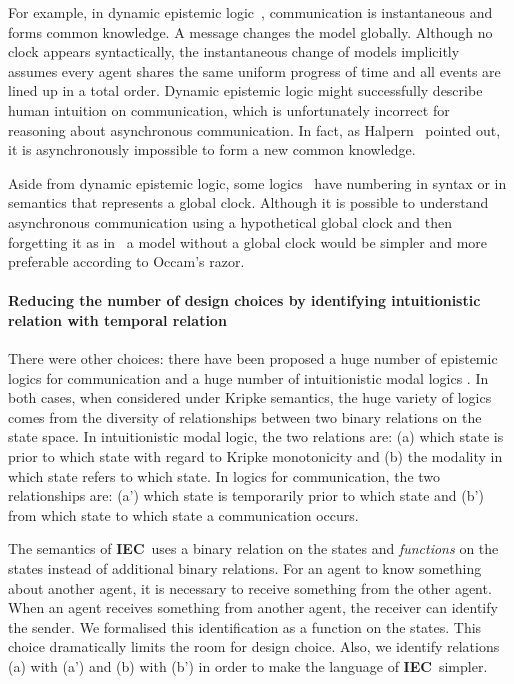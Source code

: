 \documentclass[doctor]{iscs-thesis}
\newcommand{\iec}{{\rm {\textbf{IEC}}}}
\begin{document}
For example, in dynamic epistemic logic~\cite{ditmarsch2007dynamic,van2003concurrent},
communication is instantaneous and forms common knowledge.
A message changes the model globally.
Although no clock appears syntactically,
the instantaneous change of models implicitly assumes
every agent shares the same uniform progress of time and
all events are lined up in a total order.
Dynamic epistemic logic might successfully describe human intuition on communication,
which is unfortunately incorrect for reasoning about asynchronous communication.
In fact, as Halpern~\cite{halpern1990knowledge} pointed out,
it is asynchronously impossible to form a new common knowledge.

Aside from dynamic epistemic logic, 
some logics~\cite{sato13study}
have numbering in syntax or in semantics that represents a global clock.
Although it is possible to understand asynchronous communication using a hypothetical
global clock and then forgetting it as in~\cite{halpern1990knowledge}
a model without a global clock would be simpler and more preferable according to
Occam's razor.

\paragraph{Reducing the number of design choices by identifying intuitionistic relation
    with temporal relation}
There were other choices: there have been proposed a huge number
 of epistemic logics for communication
\cite{halpern1990knowledge,van2009information,liau2003belief,%
plaza2007logics,%
balbiani2008knowable,%
 peleg1987communication,%
bieber1990logic,baltag2007epistemic,jia2004modal,costa2005formalizing}
and a huge
number of intuitionistic modal logics
\cite{hiroakira-some, 1029823, 1986,
alechina-categorical,
peleg1987communication}.
In both cases, when considered under Kripke semantics,
the huge variety of logics comes
 from the diversity of relationships
between two binary relations on the state space.
In intuitionistic modal logic, the two relations are:
(a) which state is prior to which state with regard to
Kripke monotonicity and (b) the modality in which state refers to which state.
In logics for communication, the two relationships are:
(a') which state is temporarily prior to which state and
(b') from which state to which state a communication occurs.

The semantics of \iec\, uses a
binary relation on the states and
\textit{functions} on the states instead of
additional binary relations.
For an agent to know something about another agent, it is necessary to
receive something from the other agent.
When an agent receives something from another agent,
the receiver can identify the sender.  We formalised this identification as a function on
the states.
This choice dramatically limits the
room for design choice.
Also, we identify relations
(a) with (a') and (b) with (b') in order to make the language of \iec\,
simpler.
\end{document}
